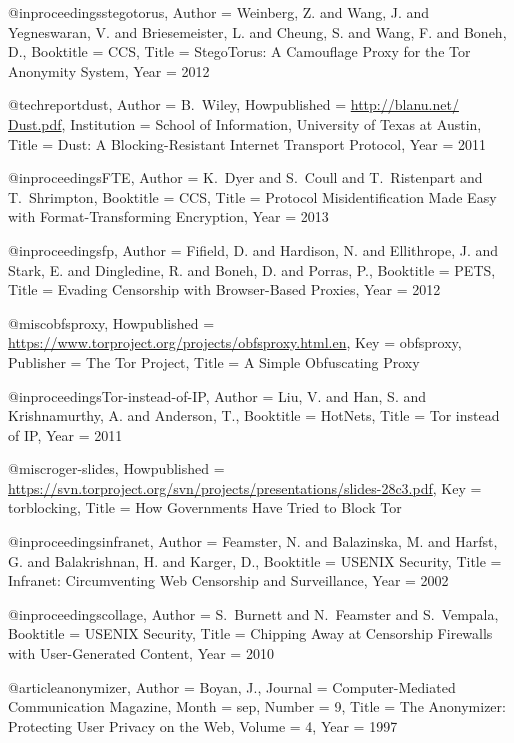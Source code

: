 {{{{{{{	@inproceedings{stegotorus,
	Author = {Weinberg, Z. and Wang, J. and Yegneswaran, V. and Briesemeister, L. and Cheung, S. and Wang, F. and Boneh, D.},
	Booktitle = {CCS},
	Title = {{StegoTorus: A Camouflage Proxy for the Tor Anonymity System}},
	Year = {2012}}
	
	@techreport{dust,
	Author = {{B.~Wiley}},
	Howpublished = {\url{http://blanu.net/ Dust.pdf}},
	Institution = {School of Information, University of Texas at Austin},
	Title = {{Dust: A Blocking-Resistant Internet Transport Protocol}},
	Year = {2011}}
	
	@inproceedings{FTE,
	Author = {K.~Dyer and S.~Coull and T.~Ristenpart and T.~Shrimpton},
	Booktitle = {CCS},
	Title = {{Protocol Misidentification Made Easy with Format-Transforming Encryption}},
	Year = {2013}}
	
	@inproceedings{fp,
	Author = {Fifield, D. and Hardison, N. and Ellithrope, J. and Stark, E. and Dingledine, R. and Boneh, D. and Porras, P.},
	Booktitle = {PETS},
	Title = {{Evading Censorship with Browser-Based Proxies}},
	Year = {2012}}
	
	@misc{obfsproxy,
	Howpublished = {\url{https://www.torproject.org/projects/obfsproxy.html.en}},
	Key = {obfsproxy},
	Publisher = {The Tor Project},
	Title = {{A Simple Obfuscating Proxy}}}
	
	@inproceedings{Tor-instead-of-IP,
	Author = {Liu, V. and Han, S. and Krishnamurthy, A. and Anderson, T.},
	Booktitle = {HotNets},
	Title = {{Tor instead of IP}},
	Year = {2011}}
	
	@misc{roger-slides,
	Howpublished = {\url{https://svn.torproject.org/svn/projects/presentations/slides-28c3.pdf}},
	Key = {torblocking},
	Title = {{How Governments Have Tried to Block Tor}}}
	
	@inproceedings{infranet,
	Author = {Feamster, N. and Balazinska, M. and Harfst, G. and Balakrishnan, H. and Karger, D.},
	Booktitle = {USENIX Security},
	Title = {{Infranet: Circumventing Web Censorship and Surveillance}},
	Year = {2002}}
	
	@inproceedings{collage,
	Author = {S.~Burnett and N.~Feamster and S.~Vempala},
	Booktitle = {USENIX Security},
	Title = {{Chipping Away at Censorship Firewalls with User-Generated Content}},
	Year = {2010}}
	
	@article{anonymizer,
	Author = {Boyan, J.},
	Journal = {Computer-Mediated Communication Magazine},
	Month = sep,
	Number = {9},
	Title = {{The Anonymizer: Protecting User Privacy on the Web}},
	Volume = {4},
	Year = {1997}}
	
}}}}}}}
